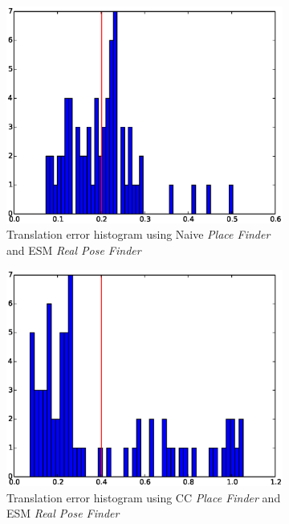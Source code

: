 \begin{figure}[htpb]
  \begin{subfigure}[b]{6cm}
          \includegraphics[width=\linewidth]{img/large_desktop/naive_esm_dist.eps}
          \caption{Translation error histogram using Naive \textit{Place Finder} and ESM \textit{Real Pose Finder}}
          \label{fig:desktop_2_CC_3pt_path_1}
  \end{subfigure}   
  \qquad
  \begin{subfigure}[b]{6cm}
          \includegraphics[width=\linewidth]{img/large_desktop/CC_esm_dist.eps}
          \caption{Translation error histogram using CC \textit{Place Finder} and ESM \textit{Real Pose Finder}}
          \label{fig:desktop_2_CC_3pt_dist_1}
  \end{subfigure}
  \caption{}
\end{figure}


